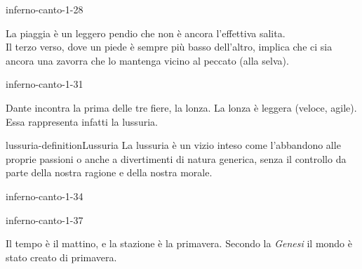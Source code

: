 \documentclass[preview]{standalone}
\begin{document}
\begin{snippet}{inferno-canto-1-28}

    La piaggia è un leggero pendio che non è ancora l'effettiva salita.
    \\
    Il terzo verso, dove un piede è sempre più basso dell'altro,
    implica che ci sia ancora una zavorra che lo mantenga vicino al peccato (alla selva).
\end{snippet}

\begin{snippet}{inferno-canto-1-31}

    Dante incontra la prima delle tre fiere, la lonza.
    La lonza è leggera (veloce, agile). Essa rappresenta infatti la lussuria.
\end{snippet}

\begin{snippetdefinition}{lussuria-definition}{Lussuria}
    La lussuria è un vizio inteso come l'abbandono alle proprie passioni o anche a divertimenti di natura generica, senza il controllo da parte della nostra ragione e della nostra morale.
\end{snippetdefinition}

\begin{snippet}{inferno-canto-1-34}

\end{snippet}

\begin{snippet}{inferno-canto-1-37}

    Il tempo è il mattino, e la stazione è la primavera.
    Secondo la \textit{Genesi} il mondo è stato creato di primavera.
\end{snippet}
\end{document}
